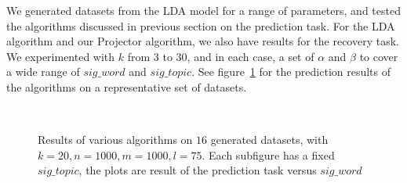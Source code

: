 We generated datasets from the LDA model for a range of parameters,
and tested the algorithms discussed in previous section on the
prediction task. For the LDA algorithm and our Projector algorithm, we
also have results for the recovery task. We experimented with $k$ from
$3$ to $30$, and in each case, a set of $\alpha$ and $\beta$ to cover
a wide range of $sig\_word$ and $sig\_topic$. See
figure~\ref{fig:predictResult} for the prediction results of the
algorithms on a representative set of datasets.
\begin{figure}
     \begin{center}

        \\ 

    \end{center}
    \caption{Results of various algorithms on $16$ generated datasets, with $k=20, n=1000,m=1000,l=75$. Each subfigure has a fixed $sig\_topic$, the plots are result of the prediction task versus $sig\_word$}
   \label{fig:predictResult}
\end{figure}

